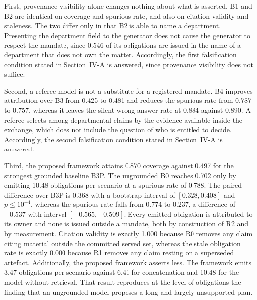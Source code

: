 \documentclass[journal]{IEEEtran}
\begin{document}
First, provenance visibility alone changes nothing about what is asserted. B1 and B2 are identical on coverage and spurious rate, and also on citation validity and staleness. The two differ only in that B2 is able to name a department. Presenting the department field to the generator does not cause the generator to respect the mandate, since 0.546 of its obligations are issued in the name of a department that does not own the matter. Accordingly, the first falsification condition stated in Section~IV-A is answered, since provenance visibility does not suffice.

Second, a referee model is not a substitute for a registered mandate. B4 improves attribution over B3 from 0.425 to 0.481 and reduces the spurious rate from 0.787 to 0.757, whereas it leaves the silent wrong answer rate at 0.884 against 0.890. A referee selects among departmental claims by the evidence available inside the exchange, which does not include the question of who is entitled to decide. Accordingly, the second falsification condition stated in Section~IV-A is answered.

Third, the proposed framework attains 0.870 coverage against 0.497 for the strongest grounded baseline B3P. The ungrounded B0 reaches 0.702 only by emitting 10.48 obligations per scenario at a spurious rate of 0.788. The paired difference over B3P is 0.368 with a bootstrap interval of $[0.328,0.408]$ and $p\le10^{-4}$, whereas the spurious rate falls from 0.774 to 0.237, a difference of $-0.537$ with interval $[-0.565,-0.509]$. Every emitted obligation is attributed to its owner and none is issued outside a mandate, both by construction of R2 and by measurement. Citation validity is exactly 1.000 because R0 removes any claim citing material outside the committed served set, whereas the stale obligation rate is exactly 0.000 because R1 removes any claim resting on a superseded artefact. Additionally, the proposed framework asserts less. The framework emits 3.47 obligations per scenario against 6.41 for concatenation and 10.48 for the model without retrieval. That result reproduces at the level of obligations the finding that an ungrounded model proposes a long and largely unsupported plan.
\end{document}
